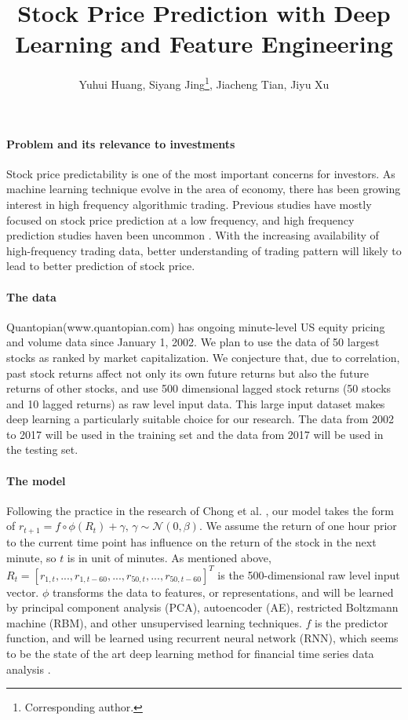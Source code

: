 \documentclass{article}
\title{Stock Price Prediction with Deep Learning and Feature Engineering}
\author{Yuhui Huang, Siyang Jing\thanks{Corresponding author.}, Jiacheng Tian, Jiyu Xu}
\begin{document}
\maketitle
\paragraph{Problem and its relevance to investments}
Stock price predictability is one of the most important concerns for investors. As machine learning technique evolve in the area of economy, there has been growing interest in high frequency algorithmic trading. Previous studies have mostly focused on stock price prediction at a low frequency, and high frequency prediction studies haven been uncommon \cite{Kearns2013}. With the increasing availability of high-frequency trading data, better understanding of trading pattern will likely to lead to better prediction of stock price.

\paragraph{The data}
Quantopian(www.quantopian.com) has ongoing minute-level US equity pricing and volume data since January 1, 2002. We plan to use the data of 50 largest stocks as ranked by market capitalization. We conjecture that, due to correlation, past stock returns affect not only its own future returns but also the future returns of other stocks, and use 500 dimensional lagged stock returns (50 stocks and 10 lagged returns) as raw level input data. This large input dataset makes deep learning a particularly suitable choice for our research. The data from 2002 to 2017 will be used in the training set and the data from 2017 will be used in the testing set.

\paragraph{The model}
Following the practice in the research of Chong et al. \cite{Chong2017}, our model takes the form of
$r_{t+1}=f\circ\phi(R_t)+\gamma,\,\gamma\sim\mathcal{N}(0,\beta)$.
We assume the return of one hour prior to the current time point has influence on the return of the stock in the next minute, so $t$ is in unit of minutes. As mentioned above, $R_t = [r_{1,t},...,r_{1,t-60},...,r_{50,t},...,r_{50,t-60}]^T$ is the 500-dimensional raw level input vector. $\phi$ transforms the data to features, or representations, and will be learned by principal component analysis (PCA), autoencoder (AE), restricted Boltzmann machine (RBM), and other unsupervised learning techniques. $f$ is the predictor function, and will be learned using recurrent neural network (RNN), which seems to be the state of the art deep learning method for financial time series data analysis \cite{Abe2018}.
\end{document}
